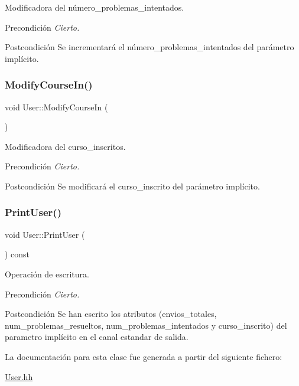 Modificadora del número\+\_\+problemas\+\_\+intentados. 

\begin{DoxyPrecond}{Precondición}
{\itshape Cierto.} 
\end{DoxyPrecond}
\begin{DoxyPostcond}{Postcondición}
Se incrementará el número\+\_\+problemas\+\_\+intentados del parámetro implícito. 
\end{DoxyPostcond}
\mbox{\label{class_user_a344a091da9a9fee9208ce425ca206c03}} 
\subsubsection{\texorpdfstring{Modify\+Course\+In()}{ModifyCourseIn()}}
{\footnotesize\ttfamily void User\+::\+Modify\+Course\+In (\begin{DoxyParamCaption}{ }\end{DoxyParamCaption})}



Modificadora del curso\+\_\+inscritos. 

\begin{DoxyPrecond}{Precondición}
{\itshape Cierto.} 
\end{DoxyPrecond}
\begin{DoxyPostcond}{Postcondición}
Se modificará el curso\+\_\+inscrito del parámetro implícito. 
\end{DoxyPostcond}
\mbox{\label{class_user_a690c6b93c7a3208ec8fe27df90b7a4f0}} 
\subsubsection{\texorpdfstring{Print\+User()}{PrintUser()}}
{\footnotesize\ttfamily void User\+::\+Print\+User (\begin{DoxyParamCaption}{ }\end{DoxyParamCaption}) const}



Operación de escritura. 

\begin{DoxyPrecond}{Precondición}
{\itshape Cierto.} 
\end{DoxyPrecond}
\begin{DoxyPostcond}{Postcondición}
Se han escrito los atributos (envios\+\_\+totales, num\+\_\+problemas\+\_\+resueltos, num\+\_\+problemas\+\_\+intentados y curso\+\_\+inscrito) del parametro implícito en el canal estandar de salida. 
\end{DoxyPostcond}


La documentación para esta clase fue generada a partir del siguiente fichero\+:\begin{DoxyCompactItemize}
\item 
\mbox{\hyperlink{_user_8hh}{User.\+hh}}\end{DoxyCompactItemize}

